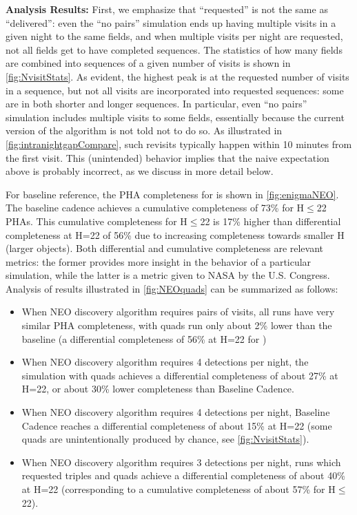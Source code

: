 {\bf Analysis Results:}
First, we emphasize that ``requested'' is not the same as
``delivered'': even the ``no pairs''
simulation  ends
up having multiple visits in a given night to the same fields, and
when multiple visits per night are requested, not all fields get to
have completed sequences. The statistics of how many fields are
combined into sequences of a given number of visits is shown in
\autoref{fig:NvisitStats}.  As evident, the highest peak is at the
requested number of visits in a sequence, but not all visits are
incorporated into requested sequences: some are in both shorter and
longer sequences. In particular, even ``no pairs'' simulation includes
multiple visits to some fields, essentially because the current
version of the algorithm is not told not to do so. As illustrated in
\autoref{fig:intranightgapCompare}, such revisits typically happen
within 10 minutes from the first visit. This (unintended) behavior
implies that the naive expectation above is probably incorrect, as we
discuss in more detail below.


For baseline reference, the PHA completeness for
 is shown in \autoref{fig:enigmaNEO}. The
baseline cadence achieves a cumulative completeness of 73\% for
H$\le$22 PHAs. This cumulative completeness for H$\le$22 is 17\%
higher than differential completeness at H=22 of 56\% due to
increasing completeness towards smaller H (larger objects). Both
differential and cumulative completeness are relevant metrics: the
former provides more insight in the behavior of a particular
simulation, while the latter is a metric given to NASA by the U.S.
Congress. Analysis of results illustrated in \autoref{fig:NEOquads}
can be summarized as follows:
\begin{itemize}
\item When NEO discovery algorithm requires pairs of visits, all runs
have very similar PHA completeness, with quads run only about 2\%
lower than the baseline (a differential completeness of 56\% at H=22
for )
\item When NEO discovery algorithm requires 4 detections per night,
the simulation with quads achieves a differential completeness of
about 27\% at H=22, or  about 30\% lower completeness than Baseline
Cadence.
\item When NEO discovery algorithm requires 4 detections per night,
Baseline Cadence reaches a differential completeness of about 15\% at
H=22 (some quads are unintentionally produced by chance, see
\autoref{fig:NvisitStats}).
\item When NEO discovery algorithm requires 3 detections per night,
runs which requested triples and quads achieve a differential
completeness of about 40\% at H=22 (corresponding to a cumulative
completeness of about 57\% for H$\le$22).
\end{itemize}

